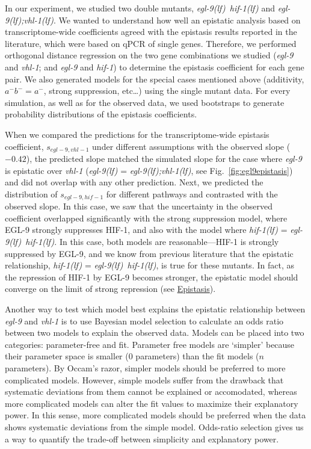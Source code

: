\documentclass[10pt, onecolumn]{article}
\newcommand{\gene}[1]{\emph{#1}}
\newcommand{\egl}{\emph{\mbox{egl-9}(lf)}}
\newcommand{\eglvhl}{\emph{\mbox{egl-9(lf);vhl-1(lf)}}}
\newcommand{\eglhif}{\emph{\mbox{egl-9(lf)}~\mbox{hif-1(lf)}}}
\newcommand{\hif}{\emph{\mbox{hif-1(lf)}}}
\newcommand{\eglp}{EGL-9}
\newcommand{\hifp}{HIF-1}
\begin{document}
In our experiment, we studied two double mutants, \eglhif{} and \eglvhl{}.
We wanted to understand how well an epistatic analysis based on transcriptome-wide
coefficients agreed with the epistasis results reported in the literature, which
were based on qPCR of single genes. Therefore, we performed orthogonal distance
regression on the two gene combinations we studied (\gene{egl-9} and
\gene{vhl-1}; and \gene{egl-9} and \gene{hif-1}) to determine the epistasis
coefficient for each gene pair. We also generated models for the special cases
mentioned above (additivity, $a^-b^-=a^-$, strong suppression, etc\ldots) using
the single mutant data. For every simulation, as well as for the observed data,
we used bootstraps to generate probability distributions of the epistasis
coefficients.

When we compared the predictions for the transcriptome-wide epistasis coefficient,
$s_{egl-9,vhl-1}$ under different assumptions with the observed slope ($-0.42$),
the predicted slope matched the simulated slope for the case where
\gene{egl-9} is epistatic over \gene{vhl-1} (\egl{} = \eglvhl{}, see
Fig.~\ref{fig:egl9epistasis}) and did not overlap with any other prediction.
Next, we predicted the distribution of $s_{egl-9,hif-1}$ for different pathways
and contrasted with the observed slope. In this case, we saw that the uncertainty
in the observed coefficient overlapped significantly with the strong suppression
model, where \eglp{} strongly suppresses \hifp{}, and also with the model where
\hif{} = \eglhif{}. In this case, both models are reasonable---\hifp{} is strongly
suppressed by \eglp{}, and we know from previous literature that the epistatic
relationship, \hif{} = \eglhif{}, is true for these mutants. In fact, as the
repression of \hifp{} by \eglp{} becomes stronger, the epistatic model should converge
on the limit of strong repression (see
\href{https://wormlabcaltech.github.io/mprsq/analysis_notebooks/epistasis_6.html}
{Epistasis}).

Another way to test which model best explains the epistatic relationship between
\gene{egl-9} and \gene{vhl-1} is to use Bayesian model selection to calculate
an odds ratio between two models to explain the observed data. Models can be placed
into two categories: parameter-free and fit. Parameter free models are `simpler'
because their parameter space is smaller (0 parameters) than the fit models ($n$
parameters). By Occam's razor, simpler models should be preferred to more
complicated models. However, simple models suffer from the drawback that
systematic deviations from them cannot be explained or accomodated, whereas more
complicated models can alter the fit values to maximize their explanatory power.
In this sense, more complicated models should be preferred when the data shows
systematic deviations from the simple model. Odds-ratio selection gives us a way
to quantify the trade-off between simplicity and explanatory power.
\end{document}

